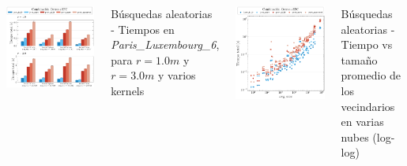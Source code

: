 \documentclass[aspectratio=169]{beamer}
\begin{document}
\begin{frame}
    \vspace{-1em} %
    \begin{columns}[t] %
        \includegraphics[width=\linewidth]{img/paris_luxembourg_6_subsets_reduced.pdf}
        {\scriptsize \centering Búsquedas aleatorias - Tiempos en \textit{Paris\_Luxembourg\_6}, para $r=1.0m$ y $r=3.0m$ y varios kernels \par}

            \includegraphics[width=0.95\linewidth]{img/loglog_subsets.pdf}
            {\scriptsize \centering Búsquedas aleatorias - Tiempo vs tamaño promedio de los vecindarios en varias nubes (log-log) \par}    \end{columns}
\end{frame}
\end{document}
